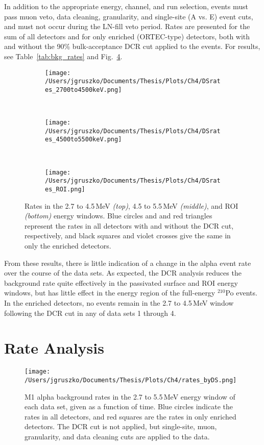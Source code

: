 In addition to the appropriate energy, channel, and run selection, events must pass muon veto, data cleaning, granularity, and single-site (A vs. E) event cuts, and must not occur during the LN-fill veto period. Rates are presented for the sum of all detectors and for only enriched (ORTEC-type) detectors, both with and without the 90\% bulk-acceptance DCR cut applied to the events. For results, see Table~\ref{tab:bkg_rates} and Fig.~\ref{fig:rate_plots}.

\begin{figure}[]
 \centering
  \begin{subfigure}[]{\textwidth}
  \centering
 \texttt{[image: /Users/jgruszko/Documents/Thesis/Plots/Ch4/DSrates\_2700to4500keV.png]}
 \label{fig:pass_rate}
\end{subfigure}
  ~
  \begin{subfigure}[]{\textwidth}
   \centering
 \texttt{[image: /Users/jgruszko/Documents/Thesis/Plots/Ch4/DSrates\_4500to5500keV.png]}
 \label{fig:peak_rate}
 \end{subfigure}
 ~
   \begin{subfigure}[]{\textwidth}
   \centering
 \texttt{[image: /Users/jgruszko/Documents/Thesis/Plots/Ch4/DSrates\_ROI.png]}
 \label{fig:ROI_rate}
 \end{subfigure}
\caption[Background rates in \MJ\ data sets 0-4]{Rates in the 2.7 to 4.5\,MeV {\it (top)}, 4.5 to 5.5\,MeV  {\it (middle)}, and ROI {\it (bottom)} energy windows. Blue circles and and red triangles represent the rates in all detectors with and without the DCR cut, respectively, and black squares and violet crosses give the same in only the enriched detectors.}
\label{fig:rate_plots}
\end{figure}

From these results, there is little indication of a change in the alpha event rate over the course of the data sets. As expected, the DCR analysis reduces the background rate quite effectively in the passivated surface and ROI energy windows, but has little effect in the energy region of the full-energy $^{210}$Po events. In the enriched detectors, no events remain in the 2.7 to 4.5\,MeV window following the DCR cut in any of data sets 1 through 4.

\section{Rate Analysis}
\begin{figure}[t]
  \centering
 \texttt{[image: /Users/jgruszko/Documents/Thesis/Plots/Ch4/rates\_byDS.png]}
\caption[M1 alpha background rates in \MJ\ data sets 0-3, as a function of time]{M1 alpha background rates in the 2.7 to 5.5\,MeV energy window of each data set, given as a function of time. Blue circles indicate the rates in all detectors, and red squares are the rates in only enriched detectors. The DCR cut is not applied, but single-site, muon, granularity, and data cleaning cuts are applied to the data.}
\label{fig:rates_byDS}
\end{figure}

